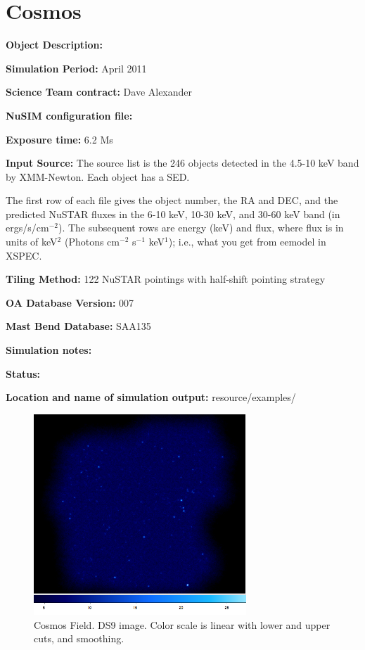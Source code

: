 
\newpage

\section{Cosmos}

\textbf{Object Description:}

\textbf{Simulation Period:} April 2011 

\textbf{Science Team contract:} Dave Alexander

\textbf{NuSIM configuration file:}

\textbf{Exposure time:} 6.2 Ms

\textbf{Input Source:} The source list is the 246 objects detected in the 4.5-10 keV band by XMM-Newton. Each object has a SED.

The first row of each file gives the object number, the RA and DEC, and the predicted NuSTAR fluxes in the 6-10 keV, 10-30 keV, and 30-60 keV band (in ergs/s/cm$^{-2}$). The subsequent rows are energy (keV) and flux, where flux is in units of keV$^2$ (Photons cm$^{-2}$ s$^{-1}$ keV$^1$); i.e., what you get from eemodel in XSPEC.

\textbf{Tiling Method:} 122 NuSTAR pointings with half-shift pointing strategy 

\textbf{OA Database Version:} 007

\textbf{Mast Bend Database:} SAA135

\textbf{Simulation notes:} 

\textbf{Status:} 

\textbf{Location and name of simulation output:} resource/examples/

\begin{figure}[h]
\begin{center}
\includegraphics[width=8cm]{Cosmos/cosmos.png}  %
\caption{Cosmos Field. DS9 image. Color scale is linear with lower and upper cuts, and smoothing.}
\label{cosmosimg} 
\end{center}
\end{figure}

